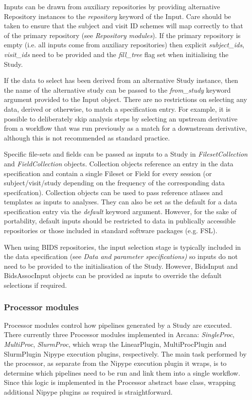 \documentclass[smallextended]{svjour3}       %
\begin{document}
Inputs can be drawn from auxiliary repositories by providing alternative
Repository instances to the \emph{repository} keyword of the Input.
Care should be taken to ensure that the subject and visit ID schemes
will map correctly to that of the primary repository (see
\emph{Repository modules}). If the primary repository is empty (i.e. all
inputs come from auxiliary repositories) then explicit
\emph{subject\_ids}, \emph{visit\_ids} need to be provided and the
\emph{fill\_tree} flag set when initialising the Study.

If the data to select has been derived from an alternative Study
instance, then the name of the alternative study can be passed to the
\emph{from\_study} keyword argument provided to the Input object. There are
no restrictions on selecting any data, derived or otherwise, to match
a specification entry. For example, it is possible to
deliberately skip analysis steps by selecting an upstream derivative
from a workflow that was run previously as a match for a downstream derivative,
although this is not recommended as standard practice.

Specific file-sets and fields can be passed as inputs to a Study in
\emph{FilesetCollection} and \emph{FieldCollection}
objects. Collection objects reference an entry in the data specification
and contain a single Fileset or Field for every session (or
subject/visit/study depending on the frequency of the corresponding data
specifcation). Collection objects can be used to pass reference atlases and
templates as inputs to analyses. They can also be set as the default
for a data specification entry via the \emph{default} keyword
argument. However, for the sake of portability, default inputs should be
restricted to data in publically accessible repositories or those included in
standard software packages (e.g. FSL).

When using BIDS repositories, the input selection stage is typically
included in the data specification (see \emph{Data and parameter
specifications)} so inputs do not need to be provided to the
initialisation of the Study. However, BidsInput and
BidsAssocInput objects can be provided as inputs to override the default
selections if required.

\subsubsection*{Processor modules}
\label{processor-modules}

Processor modules control how pipelines generated by a Study
are executed. There currently three Processor modules implemented in
Arcana: \emph{SingleProc}, \emph{MultiProc},
\emph{SlurmProc}, which wrap the LinearPlugin, MultiProcPlugin and SlurmPlugin
Nipype execution plugins, respectively. The main task performed
by the processor, as separate from the Nipype execution plugin it wraps,
is to determine which pipelines need to be run and link them into a
single workflow. Since this logic is implemented in the Processor
abstract base class, wrapping additional Nipype plugins as required is
straightforward.
\end{document}
